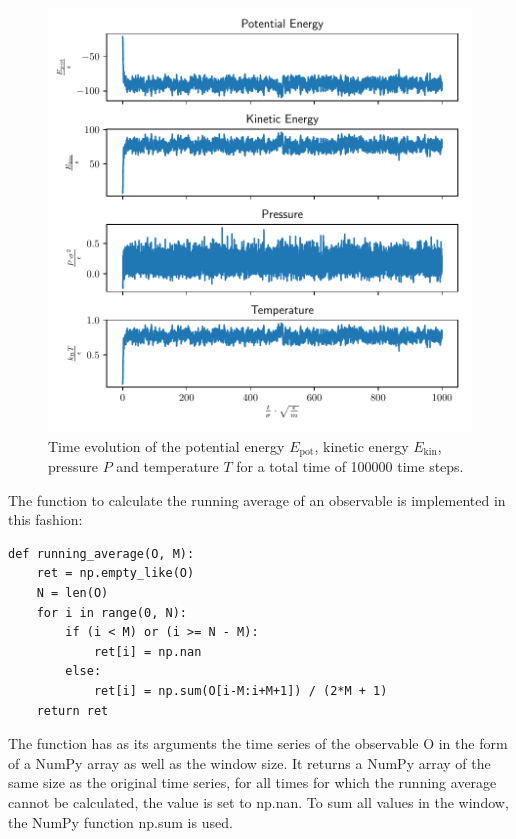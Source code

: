 \documentclass[a4paper,10pt,bibtotoc]{scrartcl}
\begin{document}
\begin{figure}[H]
        \centering
        \includegraphics[width=\linewidth]{Figure_2.pdf}
    \caption{Time evolution of the potential energy $E_\mathrm{pot}$, kinetic energy $E_\mathrm{kin}$, pressure $P$ and temperature $T$ for a total time of 100000 time steps.}
    \label{fig:fig2}
\end{figure}
The function to calculate the running average of an observable is implemented in this fashion:
\begin{lstlisting}
def running_average(O, M):
    ret = np.empty_like(O)
    N = len(O)
    for i in range(0, N):
        if (i < M) or (i >= N - M):
            ret[i] = np.nan
        else:
            ret[i] = np.sum(O[i-M:i+M+1]) / (2*M + 1)
    return ret
\end{lstlisting}
The function has as its arguments the time series of the observable O in the form of a NumPy array as well as the window size. 
It returns a NumPy array of the same size as the original time series, for all times for which the running average cannot be calculated, the value is set to np.nan. 
To sum all values in the window, the NumPy function np.sum is used.
\end{document}
